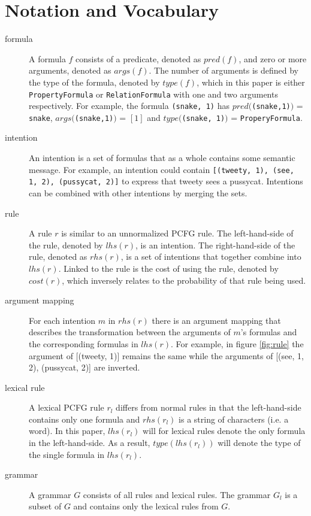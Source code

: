 \documentclass[a4paper]{article}
\begin{document}
\section{Notation and Vocabulary}
\begin{description}
    \item[formula] A formula $f$ consists of a predicate, denoted as $pred(f)$, and zero or more arguments, denoted as $args(f)$. The number of arguments is defined by the type of the formula, denoted by $type(f)$, which in this paper is either \verb|PropertyFormula| or \verb|RelationFormula| with one and two arguments respectively. For example, the formula \verb|(snake, 1)| has $pred($\verb|(snake,1)|$)$ = \verb|snake|, $args($\verb|(snake,1)|$)$ = $[1]$ and $type($\verb|(snake, 1)|$)$ = \verb|ProperyFormula|.
    \item[intention] An intention is a set of formulas that as a whole contains some semantic message. For example, an intention could contain \verb|[(tweety, 1), (see, 1, 2), (pussycat, 2)]| to express that tweety sees a pussycat. Intentions can be combined with other intentions by merging the sets.
    \item[rule] A rule $r$ is similar to an unnormalized PCFG rule. The left-hand-side of the rule, denoted by $lhs(r)$, is an intention. The right-hand-side of the rule, denoted as $rhs(r)$, is a set of intentions that together combine into $lhs(r)$. Linked to the rule is the cost of using the rule, denoted by $cost(r)$, which inversely relates to the probability of that rule being used.
    \item[argument mapping] For each intention $m$ in $rhs(r)$ there is an argument mapping that describes the transformation between the arguments of $m$'s formulas and the corresponding formulas in $lhs(r)$. For example, in figure \ref{fig:rule} the argument of [(tweety, 1)] remains the same while the arguments of [(see, 1, 2),  (pussycat, 2)] are inverted.
    \item[lexical rule] A lexical PCFG rule $r_l$ differs from normal rules in that the left-hand-side contains only one formula and $rhs(r_l)$ is a string of characters (i.e. a word). In this paper, $lhs(r_l)$ will for lexical rules denote the only formula in the left-hand-side. As a result, $type(lhs(r_l))$ will denote the type of the single formula in $lhs(r_l)$.
    \item[grammar] A grammar $G$ consists of all rules and lexical rules. The grammar $G_l$ is a subset of $G$ and contains only the lexical rules from $G$.
\end{description}
\end{document}
